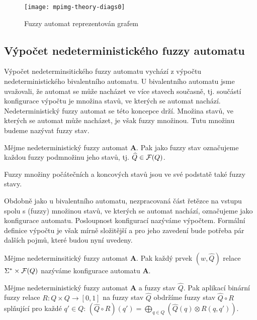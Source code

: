 \begin{figure}
 \centering
 
 \texttt{[image: mpimg-theory-diags0]}
 
 \caption{Fuzzy automat reprezentován grafem} \label{img:FuzAutDiag}
\end{figure}
  

\subsection{Výpočet nedeterministického fuzzy automatu}
Výpočet nedeterminsitického fuzzy automatu vychází z výpočtu nedeterministického bivalentního automatu. U bivalentního automatu jsme uvažovali, že automat se může nacházet ve více stavech současně, tj. součástí konfigurace výpočtu je množina stavů, ve kterých se automat nachází. Nedeterministický fuzzy automat se této koncepce drží. Množina stavů, ve kterých se automat může nacházet, je však fuzzy množinou. Tutu množinu budeme nazývat fuzzy stav.

\begin{definition}\label{def-FuzzStav}
 Mějme nedeterministický fuzzy automat $\mathbf{A}$. Pak jako fuzzy stav označujeme každou fuzzy podmnožinu jeho stavů, tj. $\widehat{Q} \in \mathcal{F}(Q)$.
\end{definition}

\begin{note}
 Fuzzy množiny počátečních a koncových stavů jsou ve své podstatě také fuzzy stavy.
\end{note}

Obdobně jako u bivalentního automatu, nezpracovaná část řetězce na vstupu spolu s (fuzzy) množinou stavů, ve kterých se automat nachází, označujeme jako konfigurace automatu. Posloupnost konfigurací nazýváme výpočtem. Formální definice výpočtu je však mírně složitější a pro jeho zavedení bude potřeba pár dalších pojmů, které budou nyní uvedeny.

\begin{definition}
  Mějme nedeterminsitický fuzzy automat $\mathbf{A}$. Pak každý prvek $(w, \widehat{Q})$ relace $\Sigma^* \times \mathcal{F}(Q)$ nazýváme konfigurace automatu $\mathbf{A}$.
\end{definition}


\begin{definition}
 Mějme nedeterministický fuzzy automat $\mathbf{A}$ a fuzzy stav $\widehat{Q}$. Pak aplikací binární fuzzy relace $R: Q \times Q \rightarrow [0, 1]$ na fuzzy stav $\widehat{Q}$ obdržíme fuzzy stav $\widehat{Q} \circ R$ splňující pro každé $q' \in Q$: $(\widehat{Q} \circ R )(q') = \bigoplus_{q \in Q} (\widehat{Q}(q) \otimes R(q, q'))$.
\end{definition}

